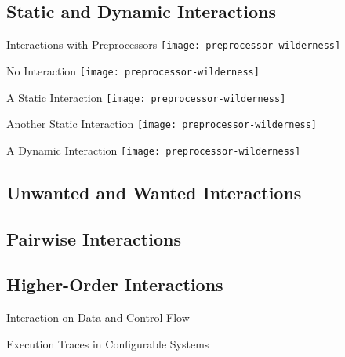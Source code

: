 \documentclass[
	aspectratio=169, %
	8pt, %
	handout, %
]{beamer}
\begin{document}
\subsection{Static and Dynamic Interactions}
\begin{frame}{Interactions with Preprocessors}
	\centering
	\texttt{[image: preprocessor-wilderness]}
\end{frame}
\begin{frame}{No Interaction}
	\centering
	\texttt{[image: preprocessor-wilderness]}
\end{frame}
\begin{frame}{A Static Interaction}
	\centering
	\texttt{[image: preprocessor-wilderness]}
\end{frame}
\begin{frame}{Another Static Interaction}
	\centering
	\texttt{[image: preprocessor-wilderness]}
\end{frame}
\begin{frame}{A Dynamic Interaction}
	\centering
	\texttt{[image: preprocessor-wilderness]}
\end{frame}

\subsection{Unwanted and Wanted Interactions} %

\subsection{Pairwise Interactions}
\subsection{Higher-Order Interactions}

\begin{frame}{Interaction on Data and Control Flow \mytitlesource{\essentialconfigurationcomplexity}}
	\centering
\end{frame}
\begin{frame}{Execution Traces in Configurable Systems \mytitlesource{\essentialconfigurationcomplexity}}
\end{frame}
\end{document}

